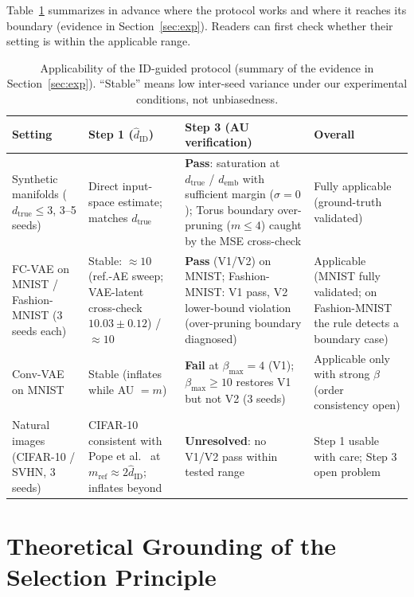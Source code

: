 \documentclass[make,article,submit,pdftex,moreauthors]{Definitions/mdpi}
\newcommand{\hatdID}{\hat{d}_{\mathrm{ID}}}
\newcommand{\dtrue}{d_{\mathrm{true}}}
\newcommand{\demb}{d_{\mathrm{emb}}}
\begin{document}
Table~\ref{tab:applicability} summarizes in advance where the protocol works
and where it reaches its boundary (evidence in Section~\ref{sec:exp}).
Readers can first check whether their setting is within the applicable
range.

\begin{table}[H]
\caption{Applicability of the ID-guided protocol (summary of the evidence in
Section~\ref{sec:exp}). ``Stable'' means low inter-seed variance under our
experimental conditions, not unbiasedness.}
\label{tab:applicability}
\small
\begin{tabular}{p{2.6cm}p{2.9cm}p{3.1cm}p{3.6cm}}
\toprule
\textbf{Setting} & \textbf{Step 1 ($\hatdID$)} & \textbf{Step 3 (AU verification)} & \textbf{Overall} \\
\midrule
Synthetic manifolds ($\dtrue \leq 3$, 3--5 seeds) & Direct input-space estimate; matches $\dtrue$ & \textbf{Pass}: saturation at $\dtrue$ / $\demb$ with sufficient margin ($\sigma = 0$); Torus boundary over-pruning ($m \leq 4$) caught by the MSE cross-check & Fully applicable (ground-truth validated) \\
\addlinespace
FC-VAE on MNIST / Fashion-MNIST (3 seeds each) & Stable: $\approx 10$ (ref.-AE sweep; VAE-latent cross-check $10.03 \pm 0.12$) / $\approx 10$ & \textbf{Pass} (V1/V2) on MNIST; Fashion-MNIST: V1 pass, V2 lower-bound violation (over-pruning boundary diagnosed) & Applicable (MNIST fully validated; on Fashion-MNIST the rule detects a boundary case) \\
\addlinespace
Conv-VAE on MNIST & Stable (inflates while AU $= m$) & \textbf{Fail} at $\beta_{\max} = 4$ (V1); $\beta_{\max} \geq 10$ restores V1 but not V2 (3 seeds) & Applicable only with strong $\beta$ (order consistency open) \\
\addlinespace
Natural images (CIFAR-10 / SVHN, 3 seeds) & CIFAR-10 consistent with Pope et al.~\cite{pope2021intrinsic} at $m_{\mathrm{ref}} \approx 2\hatdID$; inflates beyond & \textbf{Unresolved}: no V1/V2 pass within tested range & Step 1 usable with care; Step 3 open problem \\
\bottomrule
\end{tabular}
\end{table}

\section{Theoretical Grounding of the Selection Principle}\label{sec:theory}
\end{document}
